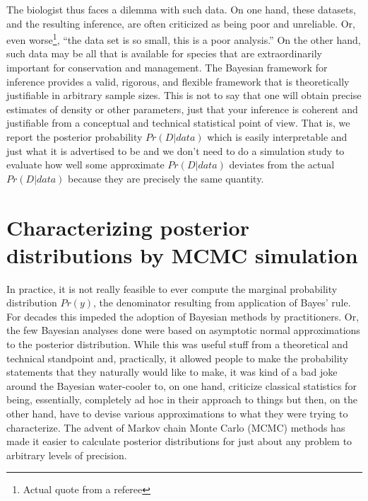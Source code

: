 The biologist thus faces a dilemma with such data. On one hand, these datasets, and the resulting inference, are often criticized as being poor and unreliable. Or, even worse\footnote{Actual quote from a referee}, ``the data set is so small, this is a poor analysis.''  On the other hand, such data may be all that is available for species that are extraordinarily important for conservation and management.    The Bayesian framework for inference provides a valid, rigorous, and flexible framework that is theoretically justifiable in arbitrary sample sizes. This is not to say that one will obtain precise estimates of density or other parameters, just that your inference is coherent and justifiable from a conceptual and technical statistical point of view. That is, we report the posterior probability $Pr(D|data)$ which is easily interpretable and just what it is advertised to be and we don't need to do a simulation study to evaluate how well some approximate $Pr(D|data)$ deviates from the actual $Pr(D|data)$ because they are precisely the same quantity.



\section{Characterizing posterior distributions by MCMC simulation}  

In practice, it is not really feasible to ever compute the marginal probability distribution $Pr(y)$, the denominator resulting from application of Bayes' rule. For decades this impeded the adoption of Bayesian methods by practitioners. Or, the few Bayesian analyses done were based on asymptotic normal approximations to the posterior distribution. While this was useful stuff from a theoretical and technical standpoint and, practically, it allowed people to make the probability statements that they naturally would like to make, it was kind of a bad joke around the Bayesian water-cooler to, on one hand, criticize classical statistics for being, essentially, completely ad hoc in their approach to things but then, on the other hand, have to devise various approximations to what they were trying to characterize. The advent of Markov chain Monte Carlo (MCMC) methods has made it easier to calculate posterior distributions for just about any problem to arbitrary levels of precision.  


